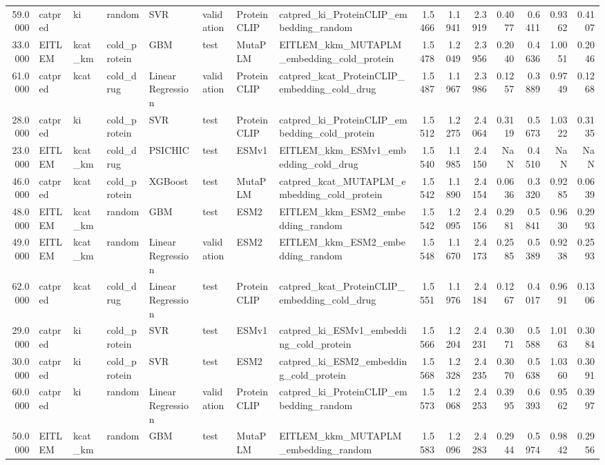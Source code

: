 \begin{tabular}{rlllllllrrrrrrr}
59.0000 & catpred & ki & random & SVR & validation & ProteinCLIP & catpred_ki_ProteinCLIP_embedding_random & 1.5466 & 1.1941 & 2.3919 & 0.4077 & 0.6411 & 0.9362 & 0.4107 \\
33.0000 & EITLEM & kcat_km & cold_protein & GBM & test & MutaPLM & EITLEM_kkm_MUTAPLM_embedding_cold_protein & 1.5478 & 1.2049 & 2.3956 & 0.2040 & 0.4636 & 1.0051 & 0.2046 \\
61.0000 & catpred & kcat & cold_drug & Linear Regression & validation & ProteinCLIP & catpred_kcat_ProteinCLIP_embedding_cold_drug & 1.5487 & 1.1967 & 2.3986 & 0.1257 & 0.3889 & 0.9749 & 0.1268 \\
28.0000 & catpred & ki & cold_protein & SVR & test & ProteinCLIP & catpred_ki_ProteinCLIP_embedding_cold_protein & 1.5512 & 1.2275 & 2.4064 & 0.3119 & 0.5673 & 1.0322 & 0.3135 \\
23.0000 & EITLEM & kcat_km & cold_drug & PSICHIC & test & ESMv1 & EITLEM_kkm_ESMv1_embedding_cold_drug & 1.5540 & 1.1985 & 2.4150 & NaN & 0.4510 & NaN & NaN \\
46.0000 & catpred & kcat & cold_protein & XGBoost & test & MutaPLM & catpred_kcat_MUTAPLM_embedding_cold_protein & 1.5542 & 1.1890 & 2.4154 & 0.0636 & 0.3320 & 0.9285 & 0.0639 \\
48.0000 & EITLEM & kcat_km & random & GBM & test & ESM2 & EITLEM_kkm_ESM2_embedding_random & 1.5542 & 1.2095 & 2.4156 & 0.2981 & 0.5841 & 0.9630 & 0.2993 \\
49.0000 & EITLEM & kcat_km & random & Linear Regression & validation & ESM2 & EITLEM_kkm_ESM2_embedding_random & 1.5548 & 1.1670 & 2.4173 & 0.2585 & 0.5389 & 0.9238 & 0.2593 \\
62.0000 & catpred & kcat & cold_drug & Linear Regression & test & ProteinCLIP & catpred_kcat_ProteinCLIP_embedding_cold_drug & 1.5551 & 1.1976 & 2.4184 & 0.1267 & 0.4017 & 0.9691 & 0.1306 \\
29.0000 & catpred & ki & cold_protein & SVR & test & ESMv1 & catpred_ki_ESMv1_embedding_cold_protein & 1.5566 & 1.2204 & 2.4231 & 0.3071 & 0.5588 & 1.0163 & 0.3084 \\
30.0000 & catpred & ki & cold_protein & SVR & test & ESM2 & catpred_ki_ESM2_embedding_cold_protein & 1.5568 & 1.2328 & 2.4235 & 0.3070 & 0.5638 & 1.0360 & 0.3091 \\
60.0000 & catpred & ki & random & Linear Regression & validation & ProteinCLIP & catpred_ki_ProteinCLIP_embedding_random & 1.5573 & 1.2068 & 2.4253 & 0.3995 & 0.6393 & 0.9562 & 0.3997 \\
50.0000 & EITLEM & kcat_km & random & GBM & test & MutaPLM & EITLEM_kkm_MUTAPLM_embedding_random & 1.5583 & 1.2096 & 2.4283 & 0.2944 & 0.5974 & 0.9842 & 0.2956 \\

\end{tabular}
